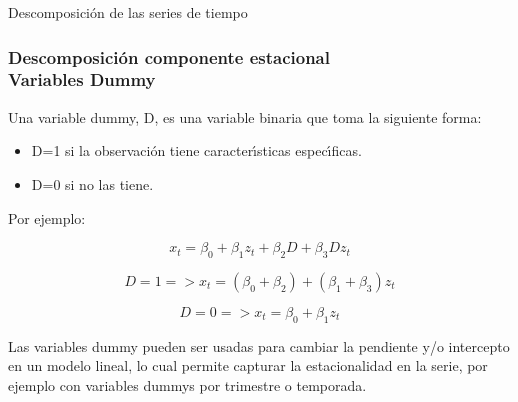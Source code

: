 \documentclass[xcolor=(list of options)]{beamer}
\begin{document}
\begin{section}{Descomposici\'on de las series de tiempo}
\begin{frame}
\end{frame}


\begin{frame}
\frametitle{Descomposici\'on componente estacional\\
Variables Dummy}

Una variable dummy, D, es una variable binaria que toma la siguiente forma:

\begin{itemize}
\item D=1  si la observaci\'on tiene caracter\'\i{}sticas espec\'\i{}ficas.
\item D=0 si no las tiene.
\end{itemize}

Por ejemplo:

\begin{equation*}
x_t  = \beta_0 + \beta_1 z_t + \beta_2 D + \beta_3 D z_t
\end{equation*}

\begin{equation*}
D=1 => x_t  = (\beta_0 + \beta_2) + (\beta_1 + \beta_3) z_t
\end{equation*}

\begin{equation*}
D=0 => x_t  = \beta_0 + \beta_1 z_t
\end{equation*}

Las variables dummy pueden ser usadas para cambiar la pendiente y/o intercepto en un modelo lineal, lo cual permite capturar la estacionalidad en la serie, por ejemplo con variables dummys por trimestre o temporada.

\end{frame}

\end{section}
\end{document}
